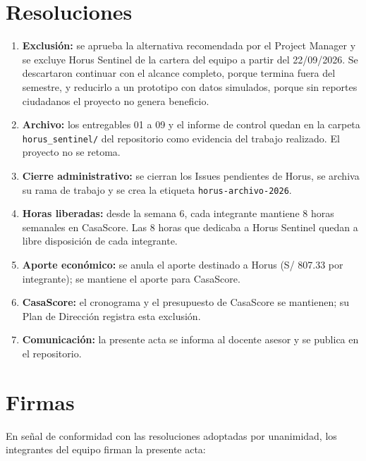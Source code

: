 \documentclass[11pt,a4paper]{article}
\begin{document}
\section{Resoluciones}
\begin{enumerate}[leftmargin=*]
    \item \textbf{Exclusión:} se aprueba la alternativa recomendada por el Project Manager y se excluye Horus Sentinel de la cartera del equipo a partir del 22/09/2026. Se descartaron continuar con el alcance completo, porque termina fuera del semestre, y reducirlo a un prototipo con datos simulados, porque sin reportes ciudadanos el proyecto no genera beneficio.
    \item \textbf{Archivo:} los entregables 01 a 09 y el informe de control quedan en la carpeta \texttt{horus\_sentinel/} del repositorio como evidencia del trabajo realizado. El proyecto no se retoma.
    \item \textbf{Cierre administrativo:} se cierran los Issues pendientes de Horus, se archiva su rama de trabajo y se crea la etiqueta \texttt{horus-archivo-2026}.
    \item \textbf{Horas liberadas:} desde la semana 6, cada integrante mantiene 8 horas semanales en CasaScore. Las 8 horas que dedicaba a Horus Sentinel quedan a libre disposición de cada integrante.
    \item \textbf{Aporte económico:} se anula el aporte destinado a Horus (S/ 807.33 por integrante); se mantiene el aporte para CasaScore.
    \item \textbf{CasaScore:} el cronograma y el presupuesto de CasaScore se mantienen; su Plan de Dirección registra esta exclusión.
    \item \textbf{Comunicación:} la presente acta se informa al docente asesor y se publica en el repositorio.
\end{enumerate}

\section{Firmas}
\noindent En señal de conformidad con las resoluciones adoptadas por unanimidad, los integrantes del equipo firman la presente acta:
\end{document}
